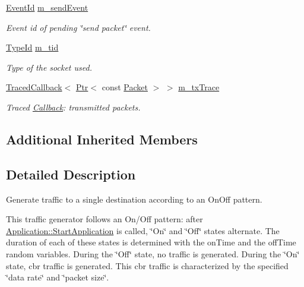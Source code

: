 \begin{DoxyCompactItemize}
\hyperlink{classns3_1_1EventId}{Event\+Id} \hyperlink{classns3_1_1OnOffApplication_a1484aba0405bef3aaf9f7904764c50f4}{m\+\_\+send\+Event}
\begin{DoxyCompactList}\small\item\em Event id of pending \char`\"{}send packet\char`\"{} event. \end{DoxyCompactList}\item 
\hyperlink{classns3_1_1TypeId}{Type\+Id} \hyperlink{classns3_1_1OnOffApplication_ad57d7f1a8a5e0e9358b41bab3c49c757}{m\+\_\+tid}
\begin{DoxyCompactList}\small\item\em Type of the socket used. \end{DoxyCompactList}\item 
\hyperlink{classns3_1_1TracedCallback}{Traced\+Callback}$<$ \hyperlink{classns3_1_1Ptr}{Ptr}$<$ const \hyperlink{classns3_1_1Packet}{Packet} $>$ $>$ \hyperlink{classns3_1_1OnOffApplication_a29186c3fee6f7ae08fe95fe0638ab307}{m\+\_\+tx\+Trace}
\begin{DoxyCompactList}\small\item\em Traced \hyperlink{classns3_1_1Callback}{Callback}\+: transmitted packets. \end{DoxyCompactList}\end{DoxyCompactItemize}
\subsection*{Additional Inherited Members}


\subsection{Detailed Description}
Generate traffic to a single destination according to an On\+Off pattern. 

This traffic generator follows an On/\+Off pattern\+: after \hyperlink{classns3_1_1Application_a3405dd01508beacce8ed6e3a20bdf05a}{Application\+::\+Start\+Application} is called, \char`\"{}\+On\char`\"{} and \char`\"{}\+Off\char`\"{} states alternate. The duration of each of these states is determined with the on\+Time and the off\+Time random variables. During the \char`\"{}\+Off\char`\"{} state, no traffic is generated. During the \char`\"{}\+On\char`\"{} state, cbr traffic is generated. This cbr traffic is characterized by the specified \char`\"{}data rate\char`\"{} and \char`\"{}packet size\char`\"{}.

